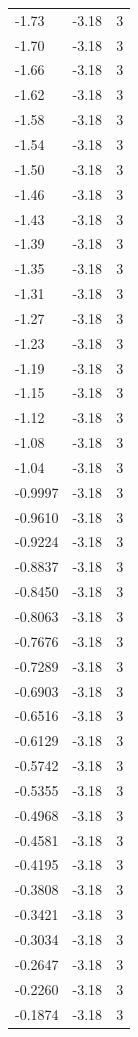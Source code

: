 \begin{longtable}{lrr}
  -1.73 & -3.18 & 3 \\
  -1.70 & -3.18 & 3 \\
  -1.66 & -3.18 & 3 \\
  -1.62 & -3.18 & 3 \\
  -1.58 & -3.18 & 3 \\
  -1.54 & -3.18 & 3 \\
  -1.50 & -3.18 & 3 \\
  -1.46 & -3.18 & 3 \\
  -1.43 & -3.18 & 3 \\
  -1.39 & -3.18 & 3 \\
  -1.35 & -3.18 & 3 \\
  -1.31 & -3.18 & 3 \\
  -1.27 & -3.18 & 3 \\
  -1.23 & -3.18 & 3 \\
  -1.19 & -3.18 & 3 \\
  -1.15 & -3.18 & 3 \\
  -1.12 & -3.18 & 3 \\
  -1.08 & -3.18 & 3 \\
  -1.04 & -3.18 & 3 \\
  -0.9997 & -3.18 & 3 \\
  -0.9610 & -3.18 & 3 \\
  -0.9224 & -3.18 & 3 \\
  -0.8837 & -3.18 & 3 \\
  -0.8450 & -3.18 & 3 \\
  -0.8063 & -3.18 & 3 \\
  -0.7676 & -3.18 & 3 \\
  -0.7289 & -3.18 & 3 \\
  -0.6903 & -3.18 & 3 \\
  -0.6516 & -3.18 & 3 \\
  -0.6129 & -3.18 & 3 \\
  -0.5742 & -3.18 & 3 \\
  -0.5355 & -3.18 & 3 \\
  -0.4968 & -3.18 & 3 \\
  -0.4581 & -3.18 & 3 \\
  -0.4195 & -3.18 & 3 \\
  -0.3808 & -3.18 & 3 \\
  -0.3421 & -3.18 & 3 \\
  -0.3034 & -3.18 & 3 \\
  -0.2647 & -3.18 & 3 \\
  -0.2260 & -3.18 & 3 \\
  -0.1874 & -3.18 & 3 \\

\end{longtable}
